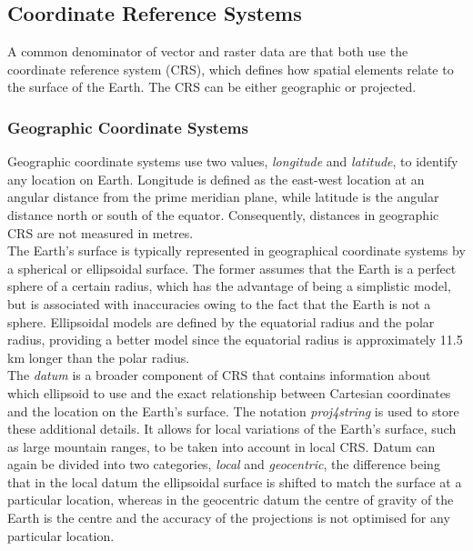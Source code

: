 \documentclass[12pt]{book}
\begin{document}
\subsection*{Coordinate Reference Systems}
A common denominator of vector and raster data are that both use the coordinate reference system (CRS), which defines how spatial elements relate to the surface of the Earth. The CRS can be either geographic or projected.
\subsubsection*{Geographic Coordinate Systems}
Geographic coordinate systems use two values, \textit{longitude} and \textit{latitude}, to identify any location on Earth. Longitude is defined as the east-west location at an angular distance from the prime meridian plane, while latitude is the angular distance north or south of the equator. Consequently, distances in geographic CRS are not measured in metres. \\
The Earth's surface is typically represented in geographical coordinate systems by a spherical or ellipsoidal surface. The former assumes that the Earth is a perfect sphere of a certain radius, which has the advantage of being a simplistic model, but is associated with inaccuracies owing to the fact that the Earth is not a sphere. Ellipsoidal models are defined by the equatorial radius and the polar radius, providing a better model since the equatorial radius is approximately 11.5 km longer than the polar radius.\\
The \textit{datum} is a broader component of CRS that contains information about which ellipsoid to use and the exact relationship between Cartesian coordinates and the location on the Earth's surface. The notation \textit{proj4string} is used to store these additional details. It allows for local variations of the Earth's surface, such as large mountain ranges, to be taken into account in local CRS. Datum can again be divided into two categories, \textit{local} and \textit{geocentric}, the difference being that in the local datum the ellipsoidal surface is shifted to match the surface at a particular location, whereas in the geocentric datum the centre of gravity of the Earth is the centre and the accuracy of the projections is not optimised for any particular location.
\end{document}
